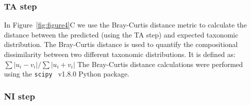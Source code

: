   \subsubsection*{TA step}
  In Figure~\ref{fig:figure4}C we use the Bray-Curtis distance metric to calculate the distance between the predicted (using the TA step) and expected taxonomic distribution.
  The Bray-Curtis distance is used to quantify the compositional dissimilarity between two different taxonomic distributions.
  It is defined as: $\sum{|u_i-v_i|} / \sum{|u_i+v_i|}$
  The Bray-Curtis distance calculations were performed using the \texttt{scipy}~\cite{virtanenSciPyFundamentalAlgorithms2020} v1.8.0 Python package.

  \subsubsection*{NI step}
